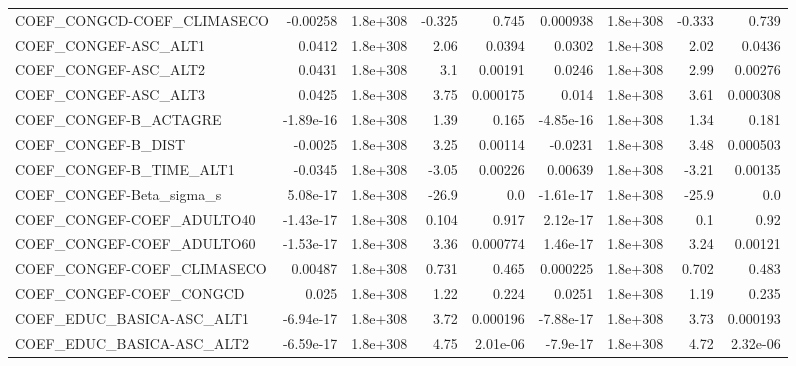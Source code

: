 \begin{tabular}{lrrrrrrrr}
COEF\_CONGCD-COEF\_CLIMASECO        &    -0.00258 &     1.8e+308 &    -0.325 &    0.745 &   0.000938 &    1.8e+308 &       -0.333 &         0.739 \\
COEF\_CONGEF-ASC\_ALT1              &      0.0412 &     1.8e+308 &      2.06 &   0.0394 &     0.0302 &    1.8e+308 &         2.02 &        0.0436 \\
COEF\_CONGEF-ASC\_ALT2              &      0.0431 &     1.8e+308 &       3.1 &  0.00191 &     0.0246 &    1.8e+308 &         2.99 &       0.00276 \\
COEF\_CONGEF-ASC\_ALT3              &      0.0425 &     1.8e+308 &      3.75 & 0.000175 &      0.014 &    1.8e+308 &         3.61 &      0.000308 \\
COEF\_CONGEF-B\_ACTAGRE             &   -1.89e-16 &     1.8e+308 &      1.39 &    0.165 &  -4.85e-16 &    1.8e+308 &         1.34 &         0.181 \\
COEF\_CONGEF-B\_DIST                &     -0.0025 &     1.8e+308 &      3.25 &  0.00114 &    -0.0231 &    1.8e+308 &         3.48 &      0.000503 \\
COEF\_CONGEF-B\_TIME\_ALT1           &     -0.0345 &     1.8e+308 &     -3.05 &  0.00226 &    0.00639 &    1.8e+308 &        -3.21 &       0.00135 \\
COEF\_CONGEF-Beta\_sigma\_s          &    5.08e-17 &     1.8e+308 &     -26.9 &      0.0 &  -1.61e-17 &    1.8e+308 &        -25.9 &           0.0 \\
COEF\_CONGEF-COEF\_ADULTO40         &   -1.43e-17 &     1.8e+308 &     0.104 &    0.917 &   2.12e-17 &    1.8e+308 &          0.1 &          0.92 \\
COEF\_CONGEF-COEF\_ADULTO60         &   -1.53e-17 &     1.8e+308 &      3.36 & 0.000774 &   1.46e-17 &    1.8e+308 &         3.24 &       0.00121 \\
COEF\_CONGEF-COEF\_CLIMASECO        &     0.00487 &     1.8e+308 &     0.731 &    0.465 &   0.000225 &    1.8e+308 &        0.702 &         0.483 \\
COEF\_CONGEF-COEF\_CONGCD           &       0.025 &     1.8e+308 &      1.22 &    0.224 &     0.0251 &    1.8e+308 &         1.19 &         0.235 \\
COEF\_EDUC\_BASICA-ASC\_ALT1         &   -6.94e-17 &     1.8e+308 &      3.72 & 0.000196 &  -7.88e-17 &    1.8e+308 &         3.73 &      0.000193 \\
COEF\_EDUC\_BASICA-ASC\_ALT2         &   -6.59e-17 &     1.8e+308 &      4.75 & 2.01e-06 &   -7.9e-17 &    1.8e+308 &         4.72 &      2.32e-06 \\

\end{tabular}
